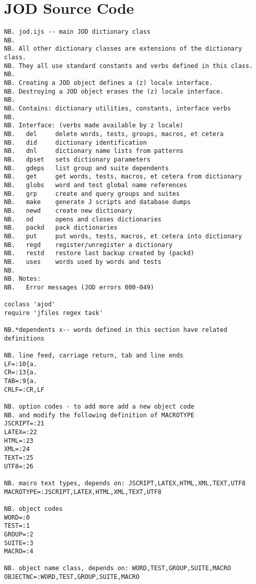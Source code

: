   
\newpage
\section{JOD Source Code}\label{ap:jodsource}

\begin{lstlisting}[frame=single,framerule=0pt,basicstyle=\ttfamily\tiny]
NB. jod.ijs -- main JOD dictionary class
NB.
NB. All other dictionary classes are extensions of the dictionary class.
NB. They all use standard constants and verbs defined in this class.
NB.
NB. Creating a JOD object defines a (z) locale interface.
NB. Destroying a JOD object erases the (z) locale interface.
NB.
NB. Contains: dictionary utilities, constants, interface verbs
NB.
NB. Interface: (verbs made available by z locale)
NB.   del     delete words, tests, groups, macros, et cetera
NB.   did     dictionary identification
NB.   dnl     dictionary name lists from patterns
NB.   dpset   sets dictionary parameters
NB.   gdeps   list group and suite dependents
NB.   get     get words, tests, macros, et cetera from dictionary
NB.   globs   word and test global name references
NB.   grp     create and query groups and suites
NB.   make    generate J scripts and database dumps
NB.   newd    create new dictionary
NB.   od      opens and closes dictionaries
NB.   packd   pack dictionaries
NB.   put     put words, tests, macros, et cetera into dictionary
NB.   regd    register/unregister a dictionary
NB.   restd   restore last backup created by (packd)
NB.   uses    words used by words and tests
NB.
NB. Notes:
NB.   Error messages (JOD errors 000-049)

coclass 'ajod'
require 'jfiles regex task'

NB.*dependents x-- words defined in this section have related definitions

NB. line feed, carriage return, tab and line ends
LF=:10{a.
CR=:13{a.
TAB=:9{a.
CRLF=:CR,LF

NB. option codes - to add more add a new object code
NB. and modify the following definition of MACROTYPE
JSCRIPT=:21
LATEX=:22
HTML=:23
XML=:24
TEXT=:25
UTF8=:26

NB. macro text types, depends on: JSCRIPT,LATEX,HTML,XML,TEXT,UTF8
MACROTYPE=:JSCRIPT,LATEX,HTML,XML,TEXT,UTF8

NB. object codes
WORD=:0
TEST=:1
GROUP=:2
SUITE=:3
MACRO=:4

NB. object name class, depends on: WORD,TEST,GROUP,SUITE,MACRO
OBJECTNC=:WORD,TEST,GROUP,SUITE,MACRO


\end{lstlisting}
